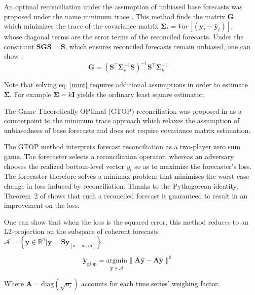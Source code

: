 \documentclass[letterpaper]{article}
\begin{document}
An optimal reconciliation under the assumption of unbiased base forecasts was proposed under the name minimum trace \cite{MinT}. This method finds the matrix $\mathbf{G}$ which minimizes the trace of the covariance matrix $\mathbf{\Sigma}_t = Var[(\mathbf{y}_t - \tilde{\mathbf{y}_t})]$, whose diagonal terms are the error terms of the reconciled forecasts. Under the constraint $\mathbf{SGS} = \mathbf{S}$, which ensures reconciled forecasts remain unbiased, one can show :
\begin{equation}
\mathbf{G}=(\mathbf{S}^{\top} \mathbf{\Sigma}_h^{-1}\mathbf{S})^{-1}\mathbf{S}^{\top}\mathbf{\Sigma}_h^{-1}
\label{mint}
\end{equation}

Note that solving eq. \ref{mint} requires additional assumptions in order to estimate $\mathbf{\Sigma}$. For example $\mathbf{\Sigma} = k\mathbf{I}$ yields the ordinary least square estimator.

The Game Theoretically OPtimal (GTOP) reconciliation was proposed in \cite{gtop} as a counterpoint to the minimum trace approach which relaxes the assumption of unbiasedness of base forecasts  and does not require covariance matrix estimation.

The GTOP method interprets forecast reconciliation as a two-player zero sum game.  The forecaster selects a reconciliation operator, whereas an adversary chooses the realized bottom-level vector $y_t$ so as to maximize the forecaster's loss.  The forecaster therefore solves a minimax problem that minimises the worst case change in loss induced by reconciliation.  Thanks to the Pythagorean identity, Theorem~2 of \cite{gtop} shows that such a reconciled forecast is guaranteed to result in an improvement on the loss.

One can show that when the loss is the squared error, this method reduces to an L2-projection on the subspace of coherent forecasts $\mathcal{A} = \left\{\mathbf{y} \in \mathbb{R}^n | \mathbf{y}=\mathbf{S}\mathbf{y}_{[n-m,m]}\right\}$.

\begin{equation}
   \tilde{\mathbf{y}}_{\mathrm{gtop}} = \underset{\tilde{\mathbf{y}}\in \mathcal{A}}{\mathrm{arg}\mathrm{min}} \|\mathbf{A\hat{y}-A\tilde{y}}\|^2
\end{equation}

Where $\mathbf{A} = \mathrm{diag}(\sqrt{a_i})$ accounts for each time series' weighing factor.

\end{document}
